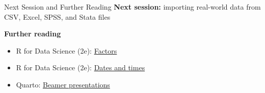 \documentclass[
  ignorenonframetext,
  aspectratio=169,
]{beamer}
\providecommand{\tightlist}{%
  \setlength{\itemsep}{0pt}\setlength{\parskip}{0pt}}\usepackage{longtable,booktabs,array}
\begin{document}
\begin{frame}{Next Session and Further Reading}
\protect\hypertarget{next-session-and-further-reading}{}
\textbf{Next session:} importing real-world data from CSV, Excel, SPSS,
and Stata files

\textbf{Further reading}

\begin{itemize}
\tightlist
\item
  R for Data Science (2e):
  \href{https://r4ds.hadley.nz/factors.html}{Factors}
\item
  R for Data Science (2e):
  \href{https://r4ds.hadley.nz/datetimes.html}{Dates and times}
\item
  Quarto:
  \href{https://quarto.org/docs/presentations/beamer.html}{Beamer
  presentations}
\end{itemize}
\end{frame}
\end{document}

